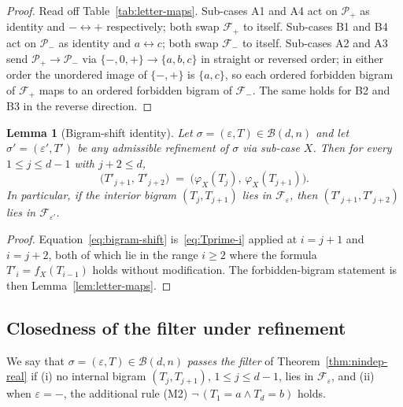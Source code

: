 \documentclass{amsart}
\newtheorem{lemma}[theorem]{Lemma}
\theoremstyle{definition}
\theoremstyle{remark}
\begin{document}
\begin{proof}
Read off Table~\ref{tab:letter-maps}.  Sub-cases A1 and A4 act on
$\mathcal{P}_+$ as identity and $- \leftrightarrow +$ respectively;
both swap $\mathcal{F}_+$ to itself.  Sub-cases B1 and B4 act on
$\mathcal{P}_-$ as identity and $a \leftrightarrow c$; both swap
$\mathcal{F}_-$ to itself.  Sub-cases A2 and A3 send $\mathcal{P}_+
\to \mathcal{P}_-$ via $\{-,0,+\} \to \{a,b,c\}$ in straight or
reversed order; in either order the unordered image of $\{-,+\}$ is
$\{a, c\}$, so each ordered forbidden bigram of $\mathcal{F}_+$ maps
to an ordered forbidden bigram of $\mathcal{F}_-$.  The same holds
for B2 and B3 in the reverse direction.
\end{proof}

\begin{lemma}[Bigram-shift identity]
\label{lem:bigram-shift}
Let $\sigma = (\varepsilon, T) \in \mathcal{B}(d, n)$ and let
$\sigma' = (\varepsilon', T')$ be any admissible refinement of
$\sigma$ via sub-case $X$.  Then for every $1 \le j \le d-1$ with
$j + 2 \le d$,
\begin{equation}\label{eq:bigram-shift}
  \bigl(T'_{j+1},\, T'_{j+2}\bigr)
  \;=\; \bigl(\varphi_X(T_j),\, \varphi_X(T_{j+1})\bigr).
\end{equation}
In particular, if the interior bigram $(T_j, T_{j+1})$ lies in
$\mathcal{F}_\varepsilon$, then $(T'_{j+1}, T'_{j+2})$ lies in
$\mathcal{F}_{\varepsilon'}$.
\end{lemma}

\begin{proof}
Equation~\eqref{eq:bigram-shift} is~\eqref{eq:Tprime-i} applied at
$i = j+1$ and $i = j+2$, both of which lie in the range $i \ge 2$
where the formula $T'_i = f_X(T_{i-1})$ holds without modification.
The forbidden-bigram statement is then
Lemma~\ref{lem:letter-maps}.
\end{proof}

\subsection{Closedness of the filter under refinement}
\label{ssec:filter-closed}

We say that $\sigma = (\varepsilon, T) \in \mathcal{B}(d, n)$
\emph{passes the filter} of Theorem~\ref{thm:nindep-real} if
\textup{(}i\textup{)} no internal bigram $(T_j, T_{j+1})$,
$1 \le j \le d-1$, lies in $\mathcal{F}_\varepsilon$, and
\textup{(}ii\textup{)} when $\varepsilon = -$, the additional rule
\textup{(M2)} $\neg\,(T_1 = a \wedge T_d = b)$ holds.
\end{document}
